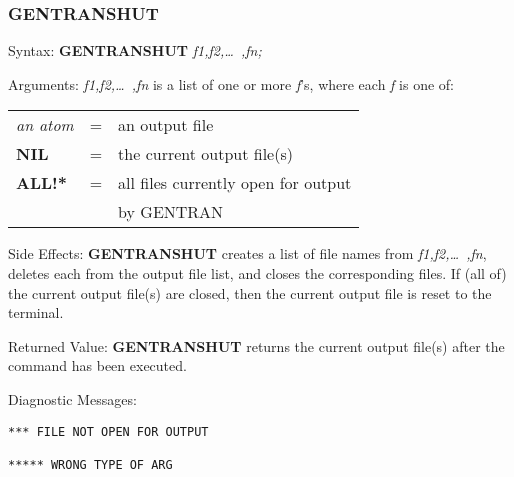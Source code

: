 \subsubsection{GENTRANSHUT}
\begin{describe}{Syntax:}
{\bf GENTRANSHUT} {\it  f1,f2,\dots\ ,fn;\/}
\end{describe}
\begin{describe}{Arguments:}
{\it f1,f2,\dots\ ,fn\/} is a list of one or more {\it f\/}'s, where each 
{\it f\/} is one of:
\begin{center}
\begin{tabular}{lll}
{\it an atom} & = & an output file\\
{\bf NIL} & = & the current output file(s)\\
{\bf ALL!*} & = & all files currently open for output \\
& & by GENTRAN\\
\end{tabular}
\end{center}
\end{describe}
\begin{describe}{Side Effects:}
{\bf GENTRANSHUT} creates a list of file names from {\it f1,f2,\dots\ ,fn},
deletes each from the output file list, and closes the
corresponding files.  If (all of) the current output file(s) are
closed, then the current output file is reset to the terminal.
\end{describe}
\begin{describe}{Returned Value:}
{\bf GENTRANSHUT} returns the current output file(s) after the command has
been executed.
\end{describe}
\begin{describe}{Diagnostic Messages:}
\begin{verbatim}
*** FILE NOT OPEN FOR OUTPUT

***** WRONG TYPE OF ARG
\end{verbatim}
\end{describe}
